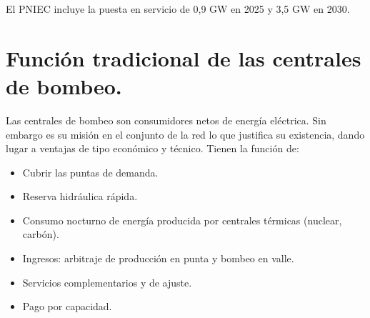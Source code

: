 		El PNIEC incluye la puesta en servicio de 0,9 GW en 2025 y 3,5 GW en 2030.
		
	\section{Función tradicional de las centrales de bombeo.}
		Las centrales de bombeo son consumidores netos de energía eléctrica. Sin embargo es su misión en el conjunto de la red lo que justifica su existencia, dando lugar a ventajas de tipo económico y técnico. Tienen la función de:
		\begin{itemize}
			\item Cubrir las puntas de demanda.
			\item Reserva hidráulica rápida.
			\item Consumo nocturno de energía producida por centrales térmicas (nuclear, carbón).
			\item Ingresos: arbitraje de producción en punta y bombeo en valle.
			\item Servicios complementarios y de ajuste.
			\item Pago por capacidad.
		\end{itemize}
	
